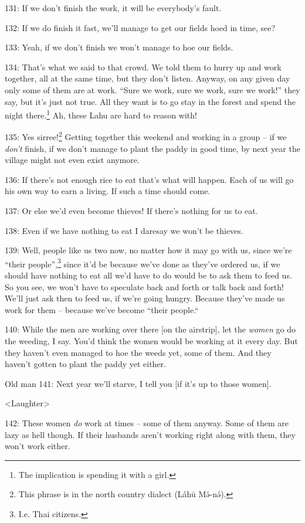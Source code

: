 131: If we don't finish the work, it will be everybody's fault.

132: If we do finish it fast, we'll manage to get our fields hoed in time, see?

133: Yeah, if we don't finish we won't manage to hoe our fields.

134: That's what we said to that crowd. We told them to hurry up and work together,
all at the same time, but they don't listen. Anyway, on any given day only some
of them are at work. ``Sure we work, sure we work, sure we work!'' they
say, but it's just not true. All they want is to go stay in the forest and spend
the night there.\footnote{The implication is spending it with a girl.} Ah, these Lahu are hard to reason with!

135: Yes sirree!\footnote{This phrase is in the north country dialect (Lâhū Mə́-nə́).} Getting together this weekend and working in a group -- if
we\textit{ don't} finish, if we don't manage to plant the paddy in good time, by
next year the village might not even exist anymore.

136: If there's not enough rice to eat that's what will happen. Each of us will
go his own way to earn a living. If such a time should come.

137: Or else we'd even become thieves! If there's nothing for us to eat.

138: Even if we have nothing to eat I daresay we won't be thieves.

139: Well, people like us two now, no matter how it may go with us, since we're
``their people'',\footnote{I.e. Thai citizens.} since it'd be because we've done as they've ordered us, if
we should have nothing to eat all we'd have to do would be to ask them to feed
us. So you see, we won't have to speculate back and forth or talk back and forth!
We'll just ask then to feed us, if we're going hungry. Because they've made us
work for them -- because we've become ``their people.``

140: While the men are working over there [on the airstrip], let the \textit{women
}go do the weeding, I say. You'd think the women would be working at it every day.
But they haven't even managed to hoe the weeds yet, some of them. And they haven't
gotten to plant the paddy yet either.

Old man 141: Next year we'll starve, I tell you [if it's up to those women].

<Laughter>

142: These women \textit{do} work at times -- some of them anyway. Some of them
are lazy as hell though. If their husbands aren't working right along with them,
they won't work either.

